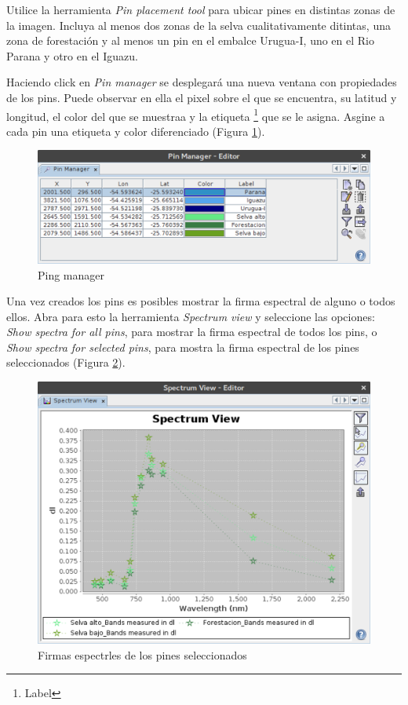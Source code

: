 \documentclass[a4paper,10pt]{book}
\begin{document}
Utilice la herramienta \emph{Pin placement tool} para ubicar pines en distintas zonas de la imagen. Incluya al menos dos zonas de la selva cualitativamente ditintas, una zona de forestación y al menos un pin en el embalce Urugua-I, uno en el Rio Parana y otro en el Iguazu.

Haciendo click en \emph{Pin manager} se desplegará una nueva ventana  con propiedades de los pins. Puede observar en ella el pixel sobre el que se encuentra, su latitud y longitud, el color del que se muestraa y la etiqueta \footnote{Label} que se le asigna. Asgine a cada pin una etiqueta y color diferenciado (Figura \ref{fig:pmg}).

\begin{figure}[h!]
    \centering
    \includegraphics[scale=0.7]{fig:pmg}
    \caption{Ping manager}
    \label{fig:pmg}
\end{figure}

Una vez creados los pins es posibles mostrar la firma espectral de alguno o todos ellos. Abra para esto la herramienta \emph{Spectrum view} y seleccione las opciones: \emph{Show spectra for all pins}, para mostrar la firma espectral de todos los pins, o \emph{Show spectra for selected pins}, para mostra la firma espectral de los pines seleccionados (Figura \ref{fig:spn}).

\begin{figure}[h!]
    \centering
    \includegraphics[scale=0.7]{fig:spn.png}
    \caption{Firmas espectrles de los pines seleccionados}
    \label{fig:spn}
\end{figure}
\end{document}
